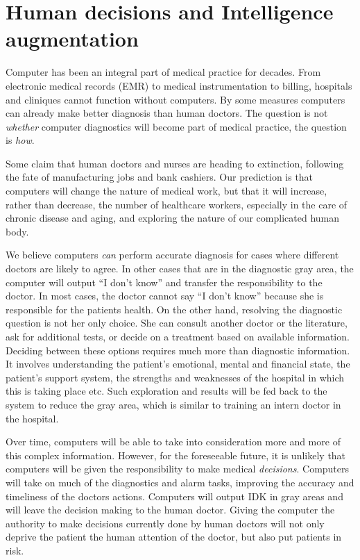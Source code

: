 \documentclass[11pt]{pnas-new}
\begin{document}
  \section{Human decisions and Intelligence augmentation}

  Computer {\color{blue}has been} an integral part of medical practice {\color{blue}for decades}. From
  {\color{blue}electronic} medical records (EMR) to medical instrumentation to billing,
  hospitals and cliniques cannot function without computers. By some
  measures computers can already make better diagnosis than human
  doctors. The question is not {\em whether} computer diagnostics will
  become part of medical practice, the question is {\em how}.

  Some claim that human doctors and nurses are heading to extinction,
  following the fate of manufacturing jobs and bank cashiers.  Our prediction is
  that computers will change the nature of medical work, but that it
  will increase, rather than decrease, the number of healthcare
  workers, especially in the care of chronic disease and aging{\color{blue}, and exploring the nature of our complicated human body}. 

  We believe computers {\em can} perform accurate diagnosis for cases where
  different doctors are likely to agree. In other cases {\color{blue}that are in the}
  diagnostic gray area, the computer will output ``I don't know'' and
  transfer the responsibility to the doctor. In most cases, the doctor
  cannot say ``I don't know'' because she is responsible for the
  patients health. On the other hand, resolving the diagnostic
  question is not her only choice. She can consult another doctor or
  the literature, ask for additional tests, or decide on a treatment
  based on available information. Deciding between these options requires much
  more than diagnostic information. It involves understanding the
  patient's emotional, mental and financial state, the patient's
  support system, the strengths and weaknesses of the hospital in
  which this is taking place etc. {\color{blue}Such exploration and results will be fed back to the system to reduce the gray area, which is similar to training an intern doctor in the hospital.}

  Over time, computers will be able to take into consideration more
  and more of this complex information. However, for the foreseeable
  future, it is unlikely that computers will be given the
  responsibility to make medical {\em decisions}. Computers
  will take on much of the diagnostics and alarm tasks, improving the
  accuracy and timeliness of the doctors actions. Computers will
  output IDK in gray areas and will leave the decision making to the
  human doctor. Giving the computer the authority to make decisions
  currently done by human doctors will {\color{blue}not only} deprive the patient the human
  attention of the doctor{\color{blue}, but also put patients in risk}.
\end{document}
